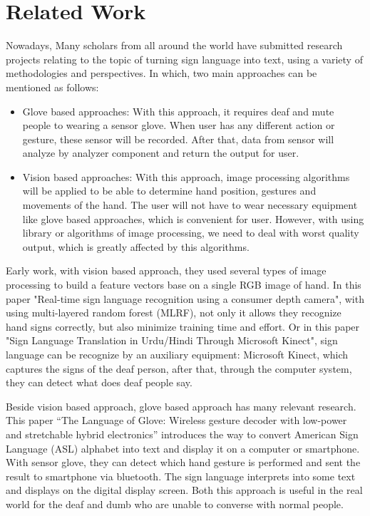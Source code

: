 \chapter{Related Work}
  Nowadays, Many scholars from all around the world have submitted research 
  projects relating to the topic of turning sign language into text, 
  using a variety of methodologies and perspectives.
  In which, two main approaches can be mentioned as follows:
  \begin{itemize}
    \item Glove based approaches:
    With this approach, it requires deaf and mute people to wearing a sensor glove. When user
    has any different action or gesture, these sensor will be recorded. After that, data from
    sensor will analyze by analyzer component and return the output for user.
    \item Vision based approaches:
    With this approach, image processing algorithms will be applied to be able to determine
    hand position, gestures and movements of the hand. The user will not have to wear necessary
    equipment like glove based approaches, which is convenient for user. However, with using
    library or algorithms of image processing, we need to deal with worst quality output, which is
    greatly affected by this algorithms.
  \end{itemize}

  Early work, with vision based approach, they used several types of
  image processing to build a feature vectors base on a single RGB image of hand.
  In this paper "Real-time sign language recognition using a consumer depth camera",
  with using multi-layered random forest (MLRF), not only it allows they recognize hand signs
  correctly, but also minimize training time and effort. Or in this paper "Sign Language Translation in Urdu/Hindi Through
  Microsoft Kinect", sign language can be recognize by an auxiliary equipment: Microsoft Kinect, which captures
  the signs of the deaf person, after that, through the computer system, they can detect what does deaf people say.

  Beside vision based approach, glove based approach has many relevant research. This paper “The Language of Glove: Wireless gesture
  decoder with low-power and stretchable hybrid electronics” introduces the way to convert American
  Sign Language (ASL) alphabet into text and display it on a computer 
  or smartphone. With sensor glove, they can detect which hand gesture is
  performed and sent the result to smartphone via bluetooth. The sign language
  interprets into some text and displays on the digital display screen.
  Both this approach is useful in the real world for the deaf and dumb 
  who are unable to converse with normal people.

